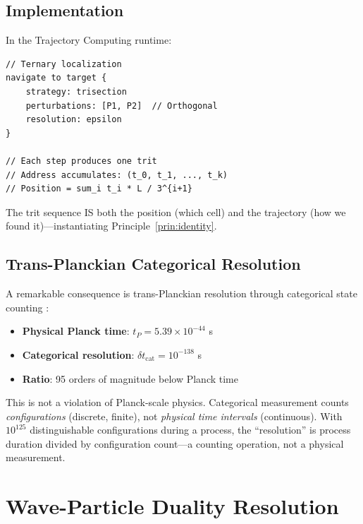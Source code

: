 \documentclass[twocolumn,10pt]{article}
\theoremstyle{remark}
\begin{document}
\subsection{Implementation}

In the Trajectory Computing runtime:
\begin{lstlisting}
// Ternary localization
navigate to target {
    strategy: trisection
    perturbations: [P1, P2]  // Orthogonal
    resolution: epsilon
}

// Each step produces one trit
// Address accumulates: (t_0, t_1, ..., t_k)
// Position = sum_i t_i * L / 3^{i+1}
\end{lstlisting}

The trit sequence IS both the position (which cell) and the trajectory (how we found it)---instantiating Principle~\ref{prin:identity}.

\subsection{Trans-Planckian Categorical Resolution}

A remarkable consequence is trans-Planckian resolution through categorical state counting \cite{sachikonye2024trisection}:

\begin{itemize}
    \item \textbf{Physical Planck time}: $t_P = 5.39 \times 10^{-44}$ s
    \item \textbf{Categorical resolution}: $\delta t_{\text{cat}} = 10^{-138}$ s
    \item \textbf{Ratio}: 95 orders of magnitude below Planck time
\end{itemize}

This is not a violation of Planck-scale physics. Categorical measurement counts \textit{configurations} (discrete, finite), not \textit{physical time intervals} (continuous). With $10^{125}$ distinguishable configurations during a process, the ``resolution'' is process duration divided by configuration count---a counting operation, not a physical measurement.

\section{Wave-Particle Duality Resolution}
\label{sec:waveparticle}
\end{document}
